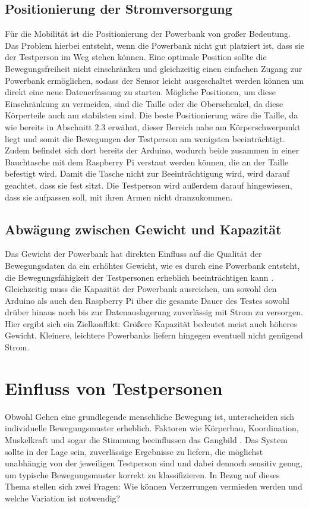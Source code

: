 \subsection{Positionierung der Stromversorgung}
Für die Mobilität ist die Positionierung der Powerbank von großer Bedeutung. Das Problem hierbei entsteht, wenn die Powerbank nicht gut platziert ist, dass sie der Testperson im Weg stehen können. Eine optimale Position sollte die Bewegungsfreiheit nicht einschränken und gleichzeitig einen einfachen Zugang zur Powerbank ermöglichen, sodass der Sensor leicht ausgeschaltet werden können um direkt eine neue Datenerfassung zu starten. Mögliche Positionen, um diese Einschränkung zu vermeiden, sind die Taille oder die Oberschenkel, da diese Körperteile auch am stabilsten sind. Die beste Positionierung wäre die Taille, da wie bereits in Abschnitt 2.3 erwähnt, dieser Bereich nahe am Körperschwerpunkt liegt und somit die Bewegungen der Testperson am wenigsten beeinträchtigt. Zudem befindet sich dort bereits der Arduino, wodurch beide zusammen in einer Bauchtasche mit dem Raspberry Pi verstaut werden können, die an der Taille befestigt wird. Damit die Tasche nicht zur Beeinträchtigung wird, wird darauf geachtet, dass sie fest sitzt. Die Testperson wird außerdem darauf hingewiesen, dass sie aufpassen soll, mit ihren Armen nicht dranzukommen.

\subsection{Abwägung zwischen Gewicht und Kapazität}
Das Gewicht der Powerbank hat direkten Einfluss auf die Qualität der Bewegungsdaten da ein erhöhtes Gewicht, wie es durch eine Powerbank entsteht, die Bewegungsfähigkeit der Testpersonen erheblich beeinträchtigen kann \cite{monfrini2023technological}. Gleichzeitig muss die Kapazität der Powerbank ausreichen, um sowohl den Arduino als auch den Raspberry Pi über die gesamte Dauer des Testes sowohl drüber hinaus noch bis zur Datenauslagerung zuverlässig mit Strom zu versorgen. Hier ergibt sich ein Zielkonflikt: Größere Kapazität bedeutet meist auch höheres Gewicht. Kleinere, leichtere Powerbanks liefern hingegen eventuell nicht genügend Strom.

\section{Einfluss von Testpersonen}
\label{sec:testperson}
Obwohl Gehen eine grundlegende menschliche Bewegung ist, unterscheiden sich individuelle Bewegungsmuster erheblich. Faktoren wie Körperbau, Koordination, Muskelkraft und sogar die Stimmung beeinflussen das Gangbild \cite{suppe2013fbl}. Das System sollte in der Lage sein, zuverlässige Ergebnisse zu liefern, die möglichst unabhängig von der jeweiligen Testperson sind und dabei dennoch sensitiv genug, um typische Bewegungsmuster korrekt zu klassifizieren. In Bezug auf dieses Thema stellen sich zwei Fragen: Wie können Verzerrungen vermieden werden und welche Variation ist notwendig?

